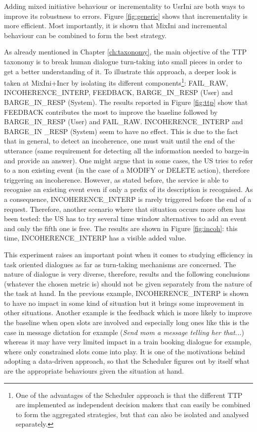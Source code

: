      	Adding mixed initiative behaviour or incrementality to UsrIni are both ways to improve its robustness to errors. Figure \ref{fig:generic} shows that incrementality is more efficient. Most importantly, it is shown that MixIni and incremental behaviour can be combined to form the best strategy.
    
    	As already mentioned in Chapter \ref{ch:taxonomy}, the main objective of the TTP taxonomy is to break human dialogue turn-taking into small pieces in order to get a better understanding of it. To illustrate this approach, a deeper look is taken at MixIni+Incr by isolating its different components\footnote{One of the advantages of the Scheduler approach is that the different TTP are implemented as independent decision makers that can easily be combined to form the aggregated strategies, but that can also be isolated and analysed separately.}: FAIL\_RAW, INCOHERENCE\_INTERP, FEEDBACK, BARGE\_IN\_RESP (User) and BARGE\_IN\_RESP (System). The results reported in Figure \ref{fig:ttp} show that FEEDBACK contributes the most to improve the baseline followed by BARGE\_IN\_RESP (User) and FAIL\_RAW. INCOHERENCE\_INTERP and BARGE\_IN \_RESP (System) seem to have no effect. This is due to the fact that in general, to detect an incoherence, one must wait until the end of the utterance (same requirement for detecting all the information needed to barge-in and provide an answer). One might argue that in some cases, the US tries to refer to a non existing event (in the case of a MODIFY or DELETE action), therefore triggering an incoherence. However, as stated before, the service is able to recognise an existing event even if only a prefix of its description is recognised. As a consequence, INCOHERENCE\_INTERP is rarely triggered before the end of a request. Therefore, another scenario where that situation occurs more often has been tested: the US has to try several time window alternatives to add an event and only the fifth one is free. The results are shown in Figure \ref{fig:incoh}: this time, INCOHERENCE\_INTERP has a visible added value.
				
				 This experiment raises an important point when it comes to studying efficiency in task oriented dialogues as far as turn-taking mechanisms are concerned. The nature of dialogue is very diverse, therefore, results and the following conclusions (whatever the chosen metric is) should not be given separately from the nature of the task at hand. In the previous example, INCOHERENCE\_INTERP is shown to have no impact in some kind of situation but it brings some improvement in other situations. Another example is the feedback which is more likely to improve the baseline when open slots are involved and especially long ones like this is the case in message dictation for example (\textit{Send mom a message telling her that...}) whereas it may have very limited impact in a train booking dialogue for example, where only constrained slots come into play. It is one of the motivations behind adopting a data-driven approach, so that the Scheduler figures out by itself what are the appropriate behaviours given the situation at hand.

